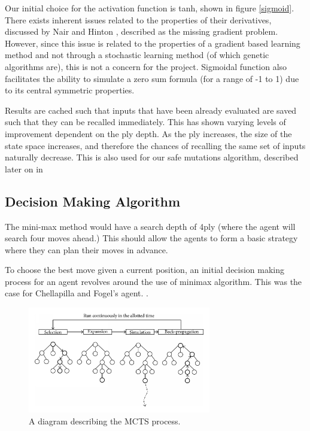 \documentclass[12pt,a4paper]{article}
\begin{document}
        Our initial choice for the activation function is tanh, shown in figure \ref{sigmoid}. There exists inherent issues related to the properties of their derivatives, discussed by Nair and Hinton \cite{nair_rectified_2010}, described as the missing gradient problem. However, since this issue is related to the properties of a gradient based learning method and not through a stochastic learning method (of which genetic algorithms are), this is not a concern for the project. Sigmoidal function also facilitates the ability to simulate a zero sum formula (for a range of -1 to 1) due to its central symmetric properties.

        Results are cached such that inputs that have been already evaluated are saved such that they can be recalled immediately. This has shown varying levels of improvement dependent on the ply depth. As the ply increases, the size of the state space increases, and therefore the chances of recalling the same set of inputs naturally decrease. This is also used for our safe mutations algorithm, described later on in 
        
    \subsection{Decision Making Algorithm}

        The mini-max method would have a search depth of 4ply (where the agent will search four moves ahead.) This should allow the agents to form a basic strategy where they can plan their moves in advance. 

        To choose the best move given a current position, an initial decision making process for an agent revolves around the use of minimax algorithm. This was the case for Chellapilla and Fogel's agent. \cite{chellapilla_evolving_1999}. 

        \begin{figure}[!h]
            \centering
            \includegraphics[width=80mm]{images/montecarlo.png}
            \caption{A diagram describing the MCTS process.}
        \end{figure}
\end{document}
